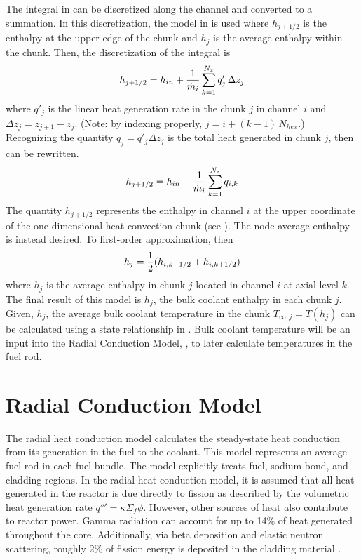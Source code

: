    The integral in  can be discretized along
    the channel and converted to a summation. In this discretization, the model
    in  is used where $h_{j+1/2}$ is the enthalpy at the
    upper edge of the chunk and $h_j$ is the average enthalpy within the chunk.
    Then, the discretization of the integral 
    is 
    \begin{equation}
      \label{eq:heat_balance}
      h_{j+1/2} = 
        h_{in} + \frac{1}{\dot{m}_i} \sum_{k=1}^{N_z} q'_{j} \, \Delta z_{j}
    \end{equation}
    where $q'_{j}$ is the linear heat generation rate in the chunk $j$ in
    channel $i$ and ${\Delta z_{j} = z_{j+1} - z_{j}}$. 
    (Note: by indexing properly, $j = i + (k-1) \, N_{hex}$.)
    Recognizing the quantity $q_{j} = q'_{j} \Delta z_{j}$
    is the total heat generated in chunk $j$, then  can 
    be rewritten.
    \begin{equation}
      h_{j+1/2} = h_{in} + \frac{1}{\dot{m}_i} \sum_{k=1}^{N_z} q_{i,k}
    \end{equation}
    The quantity $h_{j+1/2}$ represents the enthalpy in channel $i$ at the upper 
    coordinate of the one-dimensional heat convection chunk (see
    ). The node-average enthalpy is instead desired. To 
    first-order approximation, then
    \begin{equation}
      h_j = \frac{1}{2} (h_{i,k-1/2}+h_{i,k+1/2})
    \end{equation}
    where $h_j$ is the average enthalpy in chunk $j$ located in channel $i$ at
    axial level $k$.
    The final result of this model is $h_j$, the bulk coolant enthalpy in each
    chunk $j$. Given, $h_j$, the average bulk coolant temperature in the chunk
    $T_{\infty,j} = T(h_j)$ can be calculated using a state relationship in
    \cite{sodiumProp}. Bulk coolant temperature will be an input into the Radial
    Conduction Model, , to later calculate
    temperatures in the fuel rod.
  
\section{Radial Conduction Model}
  \label{sec:radial_conduction_model}
  The radial heat conduction model calculates the steady-state heat
  conduction from its generation in the fuel to the coolant. This model
  represents an average fuel rod in each fuel bundle. The model explicitly
  treats fuel, sodium bond, and cladding regions.
  In the radial heat conduction model, it is assumed that all heat generated in
  the reactor is due directly to fission as described by the volumetric heat
  generation rate ${q'''=\kappa \Sigma_f \phi}$. However, other sources of heat
  also contribute to reactor power. Gamma radiation can account for up to 14\%
  of heat generated throughout the core. Additionally, via beta deposition and
  elastic neutron scattering, roughly 2\% of fission energy is deposited in the
  cladding material \cite{FastSpectrumReactors}.
  
